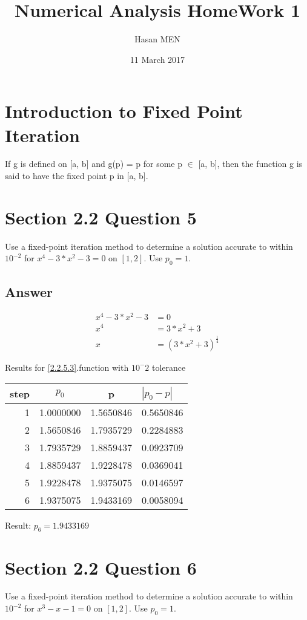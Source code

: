 \documentclass{article}
\title{Numerical Analysis HomeWork 1}
\author{Hasan MEN}
\date{11 March 2017}
\begin{document}
\maketitle

\section{Introduction to Fixed Point Iteration}
If g is defined on [a, b] and g(p) = p for some p $\in$ [a, b], then the function g is said to have the fixed point p in [a, b].


\section{Section 2.2 Question 5}
Use a fixed-point iteration method to determine a solution accurate to within $10^{-2}$ for $x^4-3*x^2-3 = 0$ on $[1, 2]$. Use $p_0 = 1$.
\subsection{Answer}
\begin{align}
\label{2.2.5.1}
x^4-3*x^2-3 & = 0\\
\label{2.2.5.2}
x^4 & = 3*x^2+3\\
\label{2.2.5.3}
x & = (3*x^2+3)^ \frac{1}{4}
\end{align}

Results for \ref{2.2.5.3}.function with $10^-2$ tolerance\\
\begin{tabular}{r|cc|l}
step & $p_0$ & p & $|p_0-p|$\\
\hline
1 & 1.0000000 & 1.5650846 & 0.5650846\\
2 & 1.5650846 & 1.7935729 & 0.2284883\\
3 & 1.7935729 & 1.8859437 & 0.0923709\\
4 & 1.8859437 & 1.9228478 & 0.0369041\\
5 & 1.9228478 & 1.9375075 & 0.0146597\\
6 & 1.9375075 & 1.9433169 & 0.0058094\\
\end{tabular}

Result: $p_6= 1.9433169$

\section{Section 2.2 Question 6}
Use a fixed-point iteration method to determine a solution accurate to within $10^{-2}$ for $x^3-x-1 = 0$ on $[1, 2]$. Use $p_0 = 1$.
\end{document}
